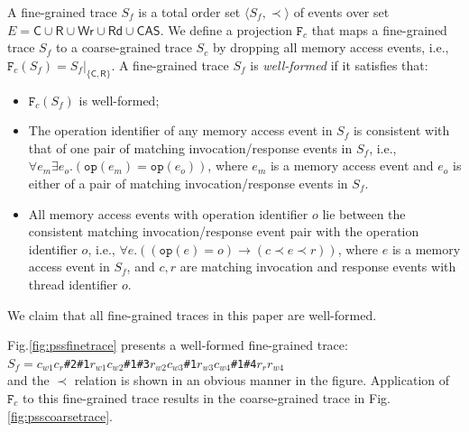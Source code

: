 \documentclass[runningheads]{llncs}
\newcommand{\ecall}{\mathsf{C}}
\newcommand{\eresp}{\mathsf{R}}
\newcommand{\ewrite}{\mathsf{Wr}}
\newcommand{\eread}{\mathsf{Rd}}
\newcommand{\ecas}{\mathsf{CAS}}
\newcommand{\pair}[1]{{\langle{#1}\rangle}}
\begin{document}
A fine-grained trace $S_f$ is a total order set $\pair{S_f,\prec}$ of events over set $E= \ecall\cup \eresp\cup \ewrite\cup \eread\cup \ecas $.
We define a projection $\mathtt{F}_{c}$ that maps a fine-grained trace $S_f$ to a coarse-grained trace $S_c$ by dropping all memory access events, i.e., $ \mathtt{F}_c(S_f) = S_f|_{\{\ecall,\eresp\} }$. A fine-grained trace $S_f$ is \textit{well-formed} if it satisfies that:
\begin{itemize}
  \item $\mathtt{F}_c(S_f)$ is well-formed;
  \item The operation identifier of any memory access event in $S_f$ is consistent with that of one pair of  matching invocation/response events  in $S_f$, i.e.,
      $\forall e_m\exists e_o.(\mathtt{op}(e_m)= \mathtt{op}(e_o))$, where $e_m$ is a memory access event and $e_o$ is either of a pair of matching invocation/response events in $S_f$.
  \item All memory access events with operation identifier $o$ lie between the consistent matching invocation/response event pair with the operation identifier $o$, i.e.,
      $\forall e.((\mathtt{op}(e)=o)\to(c\prec e\prec r))$, where $e$ is a memory access event in $S_f$, and $c,r$ are matching invocation and response events with thread identifier $o$.
\end{itemize}
\noindent We claim that all fine-grained traces in this paper are well-formed.

%


\begin{example}
Fig.\ref{fig:pssfinetrace} presents a well-formed fine-grained trace:\\
 \quad\quad\quad\quad$S_f = c_{w1}c_r$\texttt{\#2\#1}$r_{w1}c_{w2}$\texttt{\#1\#3}$r_{w2}c_{w3}$\texttt{\#1}$r_{w3}c_{w4}$\texttt{\#1\#4}$r_{r}r_{w4}$\\
and the $\prec$ relation is shown in an obvious manner in the figure. 
Application of $\mathtt{F}_{c}$ to this fine-grained trace results in the coarse-grained trace in Fig.\ref{fig:psscoarsetrace}.
\end{example}
\end{document}
